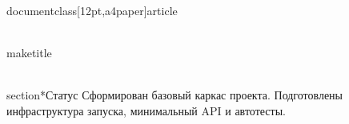 \\documentclass[12pt,a4paper]{article}
\begin{document}
\\maketitle

\\section*{Статус}
Сформирован базовый каркас проекта. Подготовлены инфраструктура запуска, минимальный API и автотесты.

\
\end{document}
